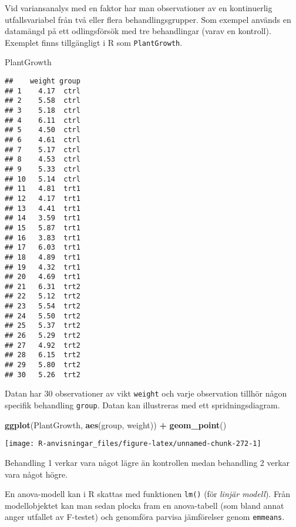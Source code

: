 \documentclass[
]{book}
\newenvironment{Shaded}{\begin{snugshade}}{\end{snugshade}}
\newcommand{\FunctionTok}[1]{\textcolor[rgb]{0.13,0.29,0.53}{\textbf{#1}}}
\newcommand{\NormalTok}[1]{#1}
\newcommand{\SpecialCharTok}[1]{\textcolor[rgb]{0.81,0.36,0.00}{\textbf{#1}}}
\theoremstyle{definition}
\theoremstyle{definition}
\theoremstyle{definition}
\theoremstyle{definition}
\theoremstyle{remark}
\begin{document}
Vid variansanalys med en faktor har man observationer av en kontinuerlig utfallsvariabel från två eller flera behandlingsgrupper. Som exempel används en datamängd på ett odlingsförsök med tre behandlingar (varav en kontroll). Exemplet finns tillgängligt i R som \texttt{PlantGrowth}.

\begin{Shaded}
\begin{Highlighting}[]
\NormalTok{PlantGrowth}
\end{Highlighting}
\end{Shaded}

\begin{verbatim}
##    weight group
## 1    4.17  ctrl
## 2    5.58  ctrl
## 3    5.18  ctrl
## 4    6.11  ctrl
## 5    4.50  ctrl
## 6    4.61  ctrl
## 7    5.17  ctrl
## 8    4.53  ctrl
## 9    5.33  ctrl
## 10   5.14  ctrl
## 11   4.81  trt1
## 12   4.17  trt1
## 13   4.41  trt1
## 14   3.59  trt1
## 15   5.87  trt1
## 16   3.83  trt1
## 17   6.03  trt1
## 18   4.89  trt1
## 19   4.32  trt1
## 20   4.69  trt1
## 21   6.31  trt2
## 22   5.12  trt2
## 23   5.54  trt2
## 24   5.50  trt2
## 25   5.37  trt2
## 26   5.29  trt2
## 27   4.92  trt2
## 28   6.15  trt2
## 29   5.80  trt2
## 30   5.26  trt2
\end{verbatim}

Datan har 30 observationer av vikt \texttt{weight} och varje observation tillhör någon specifik behandling \texttt{group}. Datan kan illustreras med ett spridningsdiagram.

\begin{Shaded}
\begin{Highlighting}[]
\FunctionTok{ggplot}\NormalTok{(PlantGrowth, }\FunctionTok{aes}\NormalTok{(group, weight)) }\SpecialCharTok{+}
  \FunctionTok{geom\_point}\NormalTok{()}
\end{Highlighting}
\end{Shaded}

\begin{center}\texttt{[image: R-anvisningar\_files/figure-latex/unnamed-chunk-272-1]} \end{center}

Behandling 1 verkar vara något lägre än kontrollen medan behandling 2 verkar vara något högre.

En anova-modell kan i R skattas med funktionen \texttt{lm()} (för \emph{linjär modell}). Från modellobjektet kan man sedan plocka fram en anova-tabell (som bland annat anger utfallet av F-testet) och genomföra parvisa jämförelser genom \texttt{emmeans}.
\end{document}
